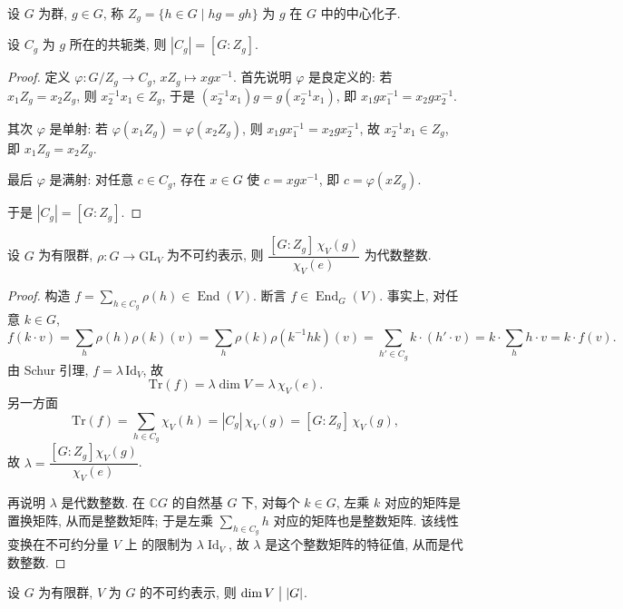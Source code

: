 \begin{definition}[中心化子]\label{def:centralizer}
设 $G$ 为群, $g\in G$, 称 $Z_g=\{h\in G\mid hg=gh\}$ 为 $g$ 在 $G$ 中的中心化子.
\end{definition}

\begin{lemma}\label{lem:class-size-index}
设 $C_g$ 为 $g$ 所在的共轭类, 则 $|C_g|=[G:Z_g]$.
\end{lemma}

\begin{proof}
定义 $\varphi\colon G/Z_g\to C_g$, $xZ_g\mapsto xgx^{-1}$.
首先说明 $\varphi$ 是良定义的: 若 $x_1Z_g=x_2Z_g$, 则 $x_2^{-1}x_1\in Z_g$, 于是
$(x_2^{-1}x_1)g=g(x_2^{-1}x_1)$, 即 $x_1gx_1^{-1}=x_2gx_2^{-1}$.

其次 $\varphi$ 是单射: 若 $\varphi(x_1Z_g)=\varphi(x_2Z_g)$, 则 $x_1gx_1^{-1}=x_2gx_2^{-1}$,
故 $x_2^{-1}x_1\in Z_g$, 即 $x_1Z_g=x_2Z_g$.

最后 $\varphi$ 是满射: 对任意 $c\in C_g$, 存在 $x\in G$ 使 $c=xgx^{-1}$,
即 $c=\varphi(xZ_g)$.

于是 $|C_g|=[G:Z_g]$.
\end{proof}

\begin{lemma}\label{lem:class-sum-integral}
设 $G$ 为有限群, $\rho\colon G\to\mathrm{GL}_V$ 为不可约表示, 则
$\dfrac{[G:Z_g]\,\chi_V(g)}{\chi_V(e)}$ 为代数整数.
\end{lemma}

\begin{proof}
构造 $f=\sum_{h\in C_g}\rho(h)\in\operatorname{End}(V)$.
断言 $f\in\operatorname{End}_G(V)$. 事实上, 对任意 $k\in G$,
\[
  f(k\cdot v)=\sum_{h}\rho(h)\rho(k)(v)=\sum_{h}\rho(k)\rho(k^{-1}hk)(v)
  =\sum_{h'\in C_g}k\cdot(h'\cdot v)
  =k\cdot\sum_{h}h\cdot v=k\cdot f(v).
\]
由 Schur 引理, $f=\lambda\,\mathrm{Id}_V$, 故
\[
  \mathrm{Tr}(f)=\lambda\dim V=\lambda\,\chi_V(e).
\]
另一方面
\[
  \mathrm{Tr}(f)=\sum_{h\in C_g}\chi_V(h)=|C_g|\,\chi_V(g)
  =[G:Z_g]\,\chi_V(g),
\]
故 $\lambda=\dfrac{[G:Z_g]\chi_V(g)}{\chi_V(e)}$.

再说明 $\lambda$ 是代数整数. 在 $\mathbb{C}G$ 的自然基 $G$ 下, 对每个 $k\in G$,
左乘 $k$ 对应的矩阵是置换矩阵, 从而是整数矩阵;
于是左乘 $\sum_{h\in C_g}h$ 对应的矩阵也是整数矩阵. 该线性变换在不可约分量 $V$ 上
的限制为 $\lambda\operatorname{Id}_V$, 故 $\lambda$ 是这个整数矩阵的特征值, 从而是代数整数.
\end{proof}

\begin{theorem}[整除定理]\label{thm:degree-divides-order}
设 $G$ 为有限群, $V$ 为 $G$ 的不可约表示, 则 $\dim V\mathrel{\big|} |G|$.
\end{theorem}

